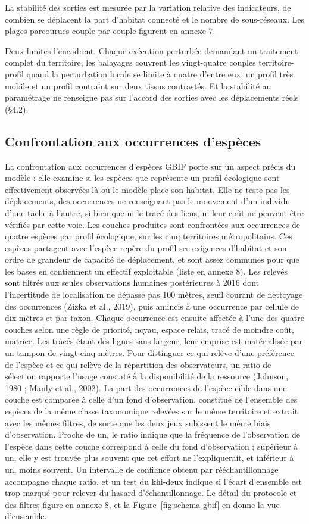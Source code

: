 \documentclass[a4paper,12pt]{report}
\begin{document}
La stabilité des sorties est mesurée par la variation relative des indicateurs, de combien se déplacent la part d'habitat connecté et le nombre de sous-réseaux. Les plages parcourues couple par couple figurent en annexe 7.

Deux limites l'encadrent. Chaque exécution perturbée demandant un traitement complet du territoire, les balayages couvrent les vingt-quatre couples territoire-profil quand la perturbation locale se limite à quatre d'entre eux, un profil très mobile et un profil contraint sur deux tissus contrastés. Et la stabilité au paramétrage ne renseigne pas sur l'accord des sorties avec les déplacements réels (§4.2).

\subsection{Confrontation aux occurrences d'espèces}
La confrontation aux occurrences d'espèces GBIF porte sur un aspect précis du modèle : elle examine si les espèces que représente un profil écologique sont effectivement observées là où le modèle place son habitat. Elle ne teste pas les déplacements, des occurrences ne renseignant pas le mouvement d'un individu d'une tache à l'autre, si bien que ni le tracé des liens, ni leur coût ne peuvent être vérifiés par cette voie. Les couches produites sont confrontées aux occurrences de quatre espèces par profil écologique, sur les cinq territoires métropolitains. Ces espèces partagent avec l'espèce repère du profil ses exigences d'habitat et son ordre de grandeur de capacité de déplacement, et sont assez communes pour que les bases en contiennent un effectif exploitable (liste en annexe 8). Les relevés sont filtrés aux seules observations humaines postérieures à 2016 dont l'incertitude de localisation ne dépasse pas 100 mètres, seuil courant de nettoyage des occurrences (Zizka et al., 2019), puis amincis à une occurrence par cellule de dix mètres et par taxon. Chaque occurrence est ensuite affectée à l'une des quatre couches selon une règle de priorité, noyau, espace relais, tracé de moindre coût, matrice. Les tracés étant des lignes sans largeur, leur emprise est matérialisée par un tampon de vingt-cinq mètres. Pour distinguer ce qui relève d'une préférence de l'espèce et ce qui relève de la répartition des observateurs, un ratio de sélection rapporte l'usage constaté à la disponibilité de la ressource (Johnson, 1980 ; Manly et al., 2002). La part des occurrences de l'espèce cible dans une couche est comparée à celle d'un fond d'observation, constitué de l'ensemble des espèces de la même classe taxonomique relevées sur le même territoire et extrait avec les mêmes filtres, de sorte que les deux jeux subissent le même biais d'observation. Proche de un, le ratio indique que la fréquence de l'observation de l'espèce dans cette couche correspond à celle du fond d'observation ; supérieur à un, elle y est trouvée plus souvent que cet effort ne l'expliquerait, et inférieur à un, moins souvent. Un intervalle de confiance obtenu par rééchantillonnage accompagne chaque ratio, et un test du khi-deux indique si l'écart d'ensemble est trop marqué pour relever du hasard d'échantillonnage. Le détail du protocole et des filtres figure en annexe 8, et la Figure~\ref{fig:schema-gbif} en donne la vue d'ensemble.
\end{document}
